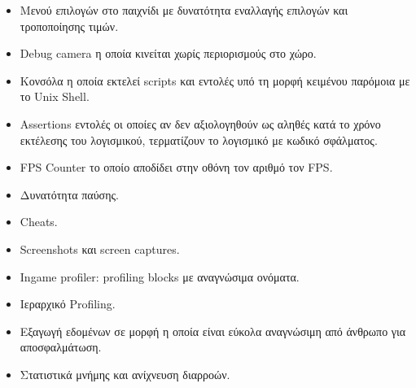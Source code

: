 \begin{itemize}
	\item Μενού επιλογών στο παιχνίδι με δυνατότητα εναλλαγής επιλογών και τροποποίησης τιμών.
	\item Debug camera η οποία κινείται χωρίς περιορισμούς στο χώρο.
	\item Κονσόλα η οποία εκτελεί scripts και εντολές υπό τη μορφή κειμένου παρόμοια με το Unix Shell.
	\item Assertions εντολές οι οποίες αν δεν αξιολογηθούν ως αληθές κατά το χρόνο εκτέλεσης του λογισμικού, τερματίζουν το λογισμικό με κωδικό σφάλματος.
	\item FPS Counter το οποίο αποδίδει στην οθόνη τον αριθμό τον \gls{FPS}.
	\item Δυνατότητα παύσης.
	\item Cheats.
	\item Screenshots και screen captures.
	\item Ιngame profiler: profiling blocks με αναγνώσιμα ονόματα.
	\item Ιεραρχικό Profiling.
	\item Εξαγωγή εδομένων σε μορφή η οποία είναι εύκολα αναγνώσιμη από άνθρωπο για αποσφαλμάτωση.
	\item Στατιστικά μνήμης και ανίχνευση διαρροών.
\end{itemize}